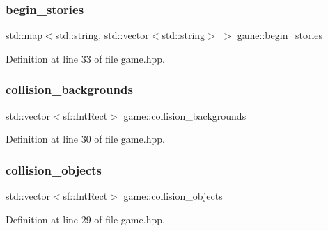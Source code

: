 \mbox{\label{classgame_a601fdbb561a442a318906ad9b57536f0}} 
\subsubsection{\texorpdfstring{begin\+\_\+stories}{begin\_stories}}
{\footnotesize\ttfamily std\+::map$<$std\+::string, std\+::vector$<$std\+::string$>$ $>$ game\+::begin\+\_\+stories\hspace{0.3cm}{\ttfamily [private]}}



Definition at line 33 of file game.\+hpp.

\mbox{\label{classgame_a961d3da89b2af402aff6c9f7c2a2b81c}} 
\subsubsection{\texorpdfstring{collision\+\_\+backgrounds}{collision\_backgrounds}}
{\footnotesize\ttfamily std\+::vector$<$sf\+::\+Int\+Rect$>$ game\+::collision\+\_\+backgrounds\hspace{0.3cm}{\ttfamily [private]}}



Definition at line 30 of file game.\+hpp.

\mbox{\label{classgame_ab83d40295556a456fd5f976335609ab1}} 
\subsubsection{\texorpdfstring{collision\+\_\+objects}{collision\_objects}}
{\footnotesize\ttfamily std\+::vector$<$sf\+::\+Int\+Rect$>$ game\+::collision\+\_\+objects\hspace{0.3cm}{\ttfamily [private]}}



Definition at line 29 of file game.\+hpp.

\mbox{\label{classgame_a278222f919fb52fb2f87e45be40fb571}} 
